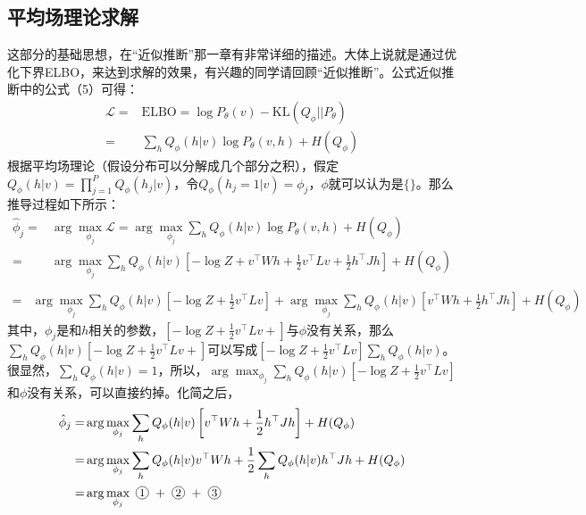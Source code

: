 \documentclass[a4paper]{article}
\newcommand*{\circled}[1]{\lower.7ex\hbox{\tikz\draw (0pt, 0pt)%
    circle (.5em) node {\makebox[1em][c]{\small #1}};}}
\begin{document}
\subsection{平均场理论求解}
这部分的基础思想，在“近似推断”那一章有非常详细的描述。大体上说就是通过优化下界ELBO，来达到求解的效果，有兴趣的同学请回顾“近似推断”。公式近似推断中的公式（5）可得：
\begin{equation}
    \begin{split}
        \mathcal{L} = & \text{ELBO} = \log P_\theta(v) - \text{KL}(Q_\phi || P_\theta) \\
        = & \sum_h Q_\phi(h|v) \log P_\theta(v,h) + H(Q_\phi)
    \end{split}
\end{equation}
根据平均场理论（假设分布可以分解成几个部分之积），假定$Q_\phi(h|v) = \prod_{j=1}^P Q_\phi(h_j|v)$，令$Q_\phi(h_j=1|v)=\phi_j$，$\phi$就可以认为是$\{  \}$。那么推导过程如下所示：
\begin{equation}
    \begin{split}
        \hat{\phi}_j = & \arg\max_{\phi_j} \mathcal{L} =  \arg\max_{\phi_j} \sum_h Q_\phi(h|v) \log P_\theta(v,h) + H(Q_\phi) \\
        = & \arg\max_{\phi_j} \sum_h Q_\phi(h|v) \left[ -\log Z  +v^{\top} W h+\frac{1}{2} v^{\top} L v+\frac{1}{2} h^{\top} J h\right] + H(Q_\phi) \\
    \end{split}
\end{equation}
\begin{equation}
    \begin{split}
        = & \arg\max_{\phi_j} \sum_h Q_\phi(h|v) \left[ -\log Z  + \frac{1}{2} v^{\top} L v \right] + \arg\max_{\phi_j} \sum_h Q_\phi(h|v) \left[ v^{\top} W h +\frac{1}{2} h^{\top} J h \right] + H(Q_\phi)
    \end{split}
\end{equation}
其中，$\phi_j$是和$h$相关的参数，$\left[ -\log Z  + \frac{1}{2} v^{\top} L v +\right]$与$\phi$没有关系，那么$\sum_h Q_\phi(h|v) \left[ -\log Z  + \frac{1}{2} v^{\top} L v +\right]$可以写成$ \left[ -\log Z  + \frac{1}{2} v^{\top} L v \right]\sum_h  Q_\phi(h|v)$。很显然，$\sum_h  Q_\phi(h|v) = 1$，所以，$ \arg\max_{\phi_j} \sum_h Q_\phi(h|v) \left[ -\log Z  + \frac{1}{2} v^{\top} L v \right] $和$\phi$没有关系，可以直接约掉。化简之后，
\begin{equation}
    \begin{split}
        \hat{\phi}_j = & \arg\max_{\phi_j} \sum_h Q_\phi(h|v) \left[ v^{\top} W h +\frac{1}{2} h^{\top} J h \right] + H(Q_\phi) \\
        = & \arg\max_{\phi_j} \sum_h Q_\phi(h|v)v^{\top} W h + \frac{1}{2}\sum_h Q_\phi(h|v)h^{\top} J h + H(Q_\phi) \\
        = & \arg\max_{\phi_j} \circled{1} + \circled{2} + \circled{3}
    \end{split}
\end{equation}
\end{document}
